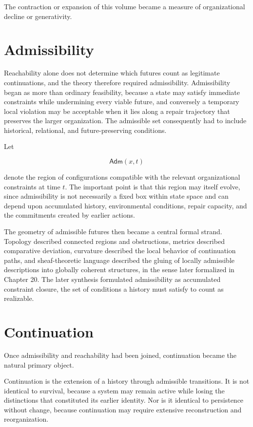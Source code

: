 \documentclass[11pt,oneside]{book}
\numberwithin{equation}{chapter}
\theoremstyle{definition}
\theoremstyle{plain}
\newcommand{\Adm}{\mathsf{Adm}}
\begin{document}
The contraction or expansion of this volume became a measure of
organizational decline or generativity.

\section{Admissibility}

Reachability alone does not determine which futures count as legitimate continuations, and the theory therefore required admissibility. Admissibility began as more than ordinary feasibility, because a state may satisfy immediate constraints while undermining every viable future, and conversely a temporary local violation may be acceptable when it lies along a repair trajectory that preserves the larger organization. The admissible set consequently had to include historical, relational, and future-preserving conditions.

Let

\[
\Adm(x,t)
\]

denote the region of configurations compatible with the relevant organizational constraints at time \(t\). The important point is that this region may itself evolve, since admissibility is not necessarily a fixed box within state space and can depend upon accumulated history, environmental conditions, repair capacity, and the commitments created by earlier actions.

The geometry of admissible futures then became a central formal strand. Topology described connected regions and obstructions, metrics described comparative deviation, curvature described the local behavior of continuation paths, and sheaf-theoretic language described the gluing of locally admissible descriptions into globally coherent structures, in the sense later formalized in Chapter 20. The later synthesis formulated admissibility as accumulated constraint closure, the set of conditions a history must satisfy to count as realizable.

\section{Continuation}

Once admissibility and reachability had been joined, continuation became the
natural primary object.

Continuation is the extension of a history through admissible transitions.
It is not identical to survival, because a system may remain active while
losing the distinctions that constituted its earlier identity. Nor is it
identical to persistence without change, because continuation may require
extensive reconstruction and reorganization.
\end{document}
